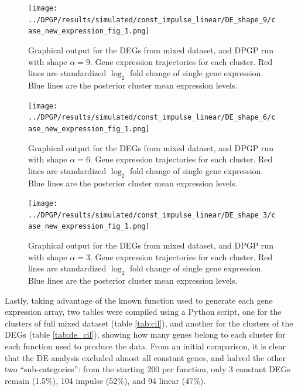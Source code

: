 \begin{figure}[!hp]
    \centering
    \texttt{[image: ../DPGP/results/simulated/const\_impulse\_linear/DE\_shape\_9/case\_new\_expression\_fig\_1.png]}
    \caption[DPGP output for DEG mixed dataset, shape 9]{Graphical output for the DEGs from mixed dataset, and DPGP run with shape $\alpha=9$. Gene expression trajectories for each cluster. Red lines are standardized $\log_{2}$ fold change of single gene expression. Blue lines are the posterior cluster mean expression levels.}\label{img:de_cil_9}
\end{figure}

\begin{figure}[!hp]
    \centering
    \texttt{[image: ../DPGP/results/simulated/const\_impulse\_linear/DE\_shape\_6/case\_new\_expression\_fig\_1.png]}
    \caption[DPGP output for DEG mixed dataset, shape 6]{Graphical output for the DEGs from mixed dataset, and DPGP run with shape $\alpha=6$. Gene expression trajectories for each cluster. Red lines are standardized $\log_{2}$ fold change of single gene expression. Blue lines are the posterior cluster mean expression levels.}\label{img:de_cil_6}
\end{figure}

\begin{figure}[!hp]
    \centering
    \texttt{[image: ../DPGP/results/simulated/const\_impulse\_linear/DE\_shape\_3/case\_new\_expression\_fig\_1.png]}
    \caption[DPGP output for DEG mixed dataset, shape 3]{Graphical output for the DEGs from mixed dataset, and DPGP run with shape $\alpha=3$. Gene expression trajectories for each cluster. Red lines are standardized $\log_{2}$ fold change of single gene expression. Blue lines are the posterior cluster mean expression levels.}\label{img:de_cil_3}
\end{figure}

Lastly, taking advantage of the known function used to generate each gene expression array, two tables were compiled using a Python script, one for the clusters of full mixed dataset (table \ref{tab:cil}), and another for the clusters of the DEGs (table \ref{tab:de_cil}), showing how many genes belong to each cluster for each function used to produce the data. From an initial comparison, it is clear that the DE analysis excluded almost all constant genes, and halved the other two ``sub-categories'': from the starting 200 per function, only 3 constant DEGs remain (1.5\%), 104 impulse (52\%), and 94 linear (47\%). 

